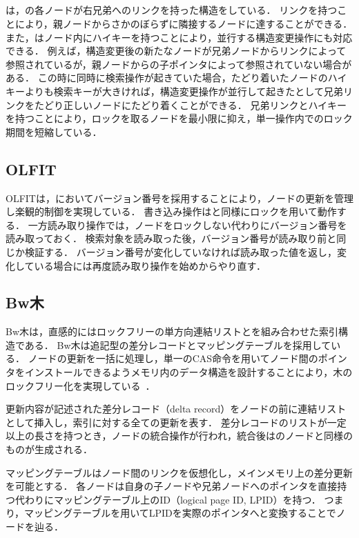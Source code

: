 \subsection{\Blinktree{}}

\Blinktree{}は，\Bptree{}の各ノードが右兄弟へのリンクを持った構造をしている．
リンクを持つことにより，親ノードからさかのぼらずに隣接するノードに達することができる．
また，\Blinktree{}はノード内にハイキーを持つことにより，並行する構造変更操作にも対応できる．
例えば，構造変更後の新たなノードが兄弟ノードからリンクによって参照されているが，親ノードからの子ポインタによって参照されていない場合がある．
この時に同時に検索操作が起きていた場合，たどり着いたノードのハイキーよりも検索キーが大きければ，構造変更操作が並行して起きたとして兄弟リンクをたどり正しいノードにたどり着くことができる．
兄弟リンクとハイキーを持つことにより，ロックを取るノードを最小限に抑え，単一操作内でのロック期間を短縮している．

\subsection{OLFIT}

OLFITは，\Blinktree{}においてバージョン番号を採用することにより，ノードの更新を管理し楽観的制御を実現している．
書き込み操作は\Blinktree{}と同様にロックを用いて動作する．
一方読み取り操作では，ノードをロックしない代わりにバージョン番号を読み取っておく．
検索対象を読み取った後，バージョン番号が読み取り前と同じか検証する．
バージョン番号が変化していなければ読み取った値を返し，変化している場合には再度読み取り操作を始めからやり直す．

\subsection{Bw木}

Bw木は，直感的にはロックフリーの単方向連結リストと\Bptree{}を組み合わせた索引構造である．
Bw木は追記型の差分レコードとマッピングテーブルを採用している．
ノードの更新を一括に処理し，単一のCAS命令を用いてノード間のポインタをインストールできるようメモリ内のデータ構造を設計することにより，木のロックフリー化を実現している~\cite{book:DatabaseInternals}．

更新内容が記述された差分レコード（delta record）をノードの前に連結リストとして挿入し，索引に対する全ての更新を表す．
差分レコードのリストが一定以上の長さを持つとき，ノードの統合操作が行われ，統合後は\Bptree{}のノードと同様のものが生成される．

マッピングテーブルはノード間のリンクを仮想化し，メインメモリ上の差分更新を可能とする．
各ノードは自身の子ノードや兄弟ノードへのポインタを直接持つ代わりにマッピングテーブル上のID（logical page ID, LPID）を持つ．
つまり，マッピングテーブルを用いてLPIDを実際のポインタへと変換することでノードを辿る．

